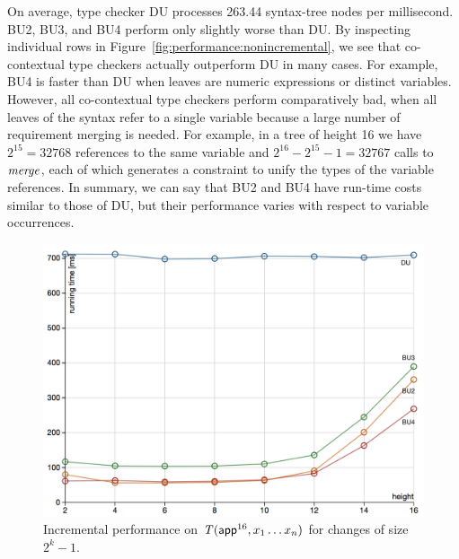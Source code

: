 \documentclass{llncs}
\begin{document}
On average, type checker DU processes 263.44 syntax-tree nodes per
millisecond. BU2, BU3, and BU4 perform only slightly worse than
DU. By inspecting individual rows in
Figure~\ref{fig:performance:nonincremental}, we see that co-contextual type
checkers actually outperform DU in many cases. For example, BU4 is faster than
DU when leaves are numeric expressions or distinct variables. However, all
co-contextual type checkers perform comparatively bad, when all leaves of
the syntax refer to a single variable because a large
number of requirement merging is needed. For example, in a tree of height 16 we have
$2^{15} = 32768$ references to the same variable and $2^{16} - 2^{15} - 1 =
32767$ calls to $\mathit{merge}$, each of which generates a constraint to unify the
types of the variable references. In summary, we can say that BU2 and BU4 have
run-time costs similar to those of DU, but their performance varies with respect
to variable occurrences.

\begin{figure}[t]
  \centering
  \includegraphics[width=.95\linewidth]{incremental_16_App_x1_xn_labeled}
  \caption{Incremental performance on $\mathit{T}({\textsf{app}}^{16},x_1 \dots x_n)$ for changes of size $2^k-1$.}
  \label{fig:performance:incremental:graph}
\end{figure}
\end{document}
